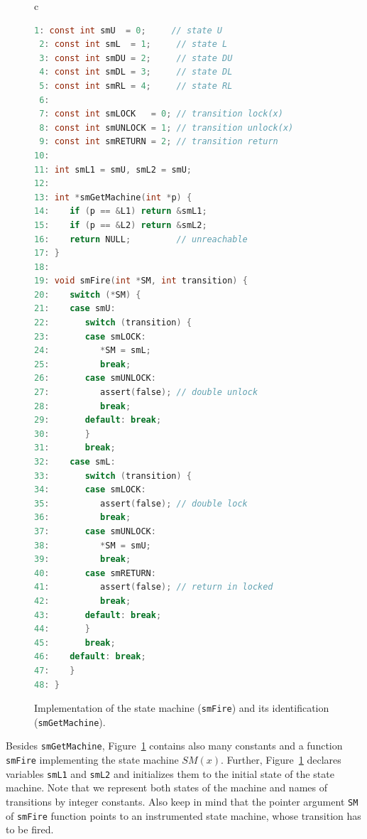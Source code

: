 \documentclass[10pt]{llncs}
\newcommand{\SM}{{\textit{SM}}}
\begin{document}

\begin{figure}[!t]
  \centering
  \begin{tabular}{c}
    \begin{lstlisting}[language=C]
 1: const int smU  = 0;     // state U
 2: const int smL  = 1;     // state L
 3: const int smDU = 2;     // state DU
 4: const int smDL = 3;     // state DL
 5: const int smRL = 4;     // state RL
 6:
 7: const int smLOCK   = 0; // transition lock(x)
 8: const int smUNLOCK = 1; // transition unlock(x)
 9: const int smRETURN = 2; // transition return
10:
11: int smL1 = smU, smL2 = smU;
12:
13: int *smGetMachine(int *p) {
14:    if (p == &L1) return &smL1;
15:    if (p == &L2) return &smL2;
16:    return NULL;         // unreachable
17: }
18:
19: void smFire(int *SM, int transition) {
20:    switch (*SM) {
21:    case smU:
22:       switch (transition) {
23:       case smLOCK:
24:          *SM = smL;
25:          break;
26:       case smUNLOCK:
27:          assert(false); // double unlock
28:          break;
29:       default: break;
30:       }
31:       break;
32:    case smL:
33:       switch (transition) {
34:       case smLOCK:
35:          assert(false); // double lock
36:          break;
37:       case smUNLOCK:
38:          *SM = smU;
39:          break;
40:       case smRETURN:
41:          assert(false); // return in locked
42:          break;
43:       default: break;
44:       }
45:       break;
46:    default: break;
47:    }
48: }
    \end{lstlisting}
  \end{tabular}
  \caption{Implementation of the state machine (\texttt{smFire}) and its
    identification (\texttt{smGet\-Machine}).}
  \label{fig:fire}
\end{figure}

Besides \texttt{smGetMachine}, Figure~\ref{fig:fire} contains also many
constants and a function \texttt{smFire} implementing the state machine
$\SM(x)$. Further, Figure~\ref{fig:fire} declares variables \texttt{smL1} and
\texttt{smL2} and initializes them to the initial state of the state machine.
Note that we represent both states of the machine and names of transitions by
integer constants. Also keep in mind that the pointer argument \texttt{SM} of
\texttt{smFire} function points to an instrumented state machine, whose
transition has to be fired.
\end{document}
